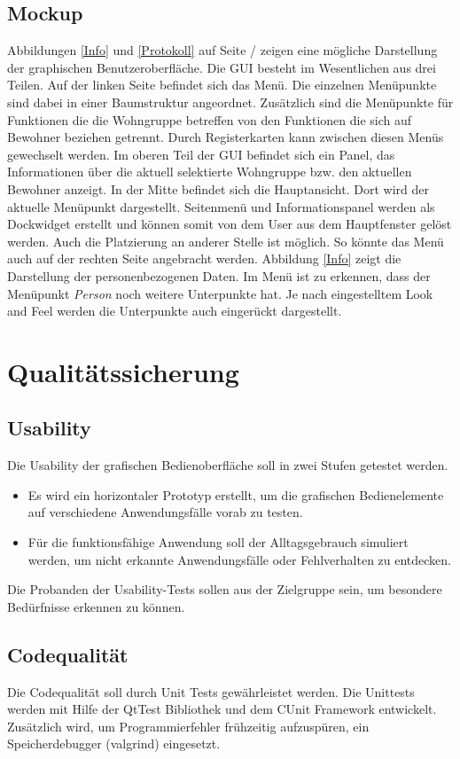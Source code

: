 \documentclass[a4paper,10pt]{article}
\begin{document}
\subsection{Mockup}
Abbildungen \ref{Info} und \ref{Protokoll} auf Seite \pageref{Info} / \pageref{Protokoll}  zeigen eine mögliche Darstellung der graphischen Benutzeroberfläche. 
Die GUI besteht im Wesentlichen aus drei Teilen. Auf der linken Seite befindet sich das Menü. Die einzelnen Menüpunkte sind dabei in einer Baumstruktur angeordnet. 
Zusätzlich sind die Menüpunkte für Funktionen die die Wohngruppe betreffen von den Funktionen die sich auf Bewohner beziehen getrennt. 
Durch Registerkarten kann zwischen diesen Menüs gewechselt werden. Im oberen Teil der GUI befindet sich ein Panel, das Informationen über die aktuell selektierte Wohngruppe bzw. den aktuellen Bewohner anzeigt. 
In der Mitte befindet sich die Hauptansicht. Dort wird der aktuelle Menüpunkt dargestellt. Seitenmenü und Informationspanel werden als Dockwidget erstellt und können 
somit von dem User aus dem Hauptfenster gelöst werden. Auch die Platzierung an anderer Stelle ist möglich. So könnte das Menü auch auf der rechten Seite angebracht werden.
\newline
Abbildung \ref{Info} zeigt die Darstellung der personenbezogenen Daten. Im Menü ist zu erkennen, dass der Menüpunkt \emph{Person} noch weitere Unterpunkte hat. 
Je nach eingestelltem Look and Feel werden die Unterpunkte auch eingerückt dargestellt.

\section{Qualitätssicherung}
\subsection{Usability}
Die Usability der grafischen Bedienoberfläche soll in zwei Stufen getestet werden.
\begin{itemize}
	\item Es wird ein horizontaler Prototyp erstellt,  um die grafischen Bedienelemente auf verschiedene Anwendungsfälle vorab zu testen. 
	\item Für die funktionsfähige Anwendung soll der Alltagsgebrauch simuliert werden, um nicht erkannte Anwendungsfälle oder Fehlverhalten zu entdecken.
\end{itemize}
Die Probanden der Usability-Tests sollen aus der Zielgruppe sein, um besondere Bedürfnisse erkennen zu können.    
\subsection{Codequalität}
Die Codequalität soll durch Unit Tests gewährleistet werden.
Die Unittests werden mit Hilfe der QtTest Bibliothek und dem CUnit Framework entwickelt.
Zusätzlich wird, um Programmierfehler frühzeitig aufzuspüren, ein Speicherdebugger (valgrind) eingesetzt.
\end{document}
